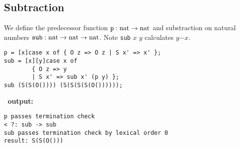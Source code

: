 \subsection{Subtraction\label{ex:sub}}
We define the predecessor function $\mathtt{p} : \mathrm{nat} \rightarrow
\mathrm{nat}$ and substraction on natural
numbers $\mathtt{sub} : \mathrm{nat} \rightarrow \mathrm{nat} \rightarrow \mathrm{nat}$. Note {\tt sub} $x$ $y$
calculates $y \stackrel{\cdot}{-} x$.
\begin{verbatim}
p = [x]case x of { O z => O z | S x' => x' };
sub = [x][y]case x of
        { O z => y
        | S x' => sub x' (p y) };
sub (S(S(O()))) (S(S(S(S(O())))));
\end{verbatim}
{\bf \foetus\ output:}\nopagebreak
\begin{verbatim}
p passes termination check
< ?: sub -> sub
sub passes termination check by lexical order 0
result: S(S(O()))
\end{verbatim}

